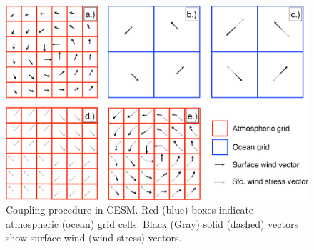 \documentclass[draft,ms]{AGUTeX}
\begin{document}

%
%
%
%
%
%


\newpage

\begin{figure}
\includegraphics[width=0.8\linewidth]{fig_coupling-schematic.pdf}
\caption{Coupling procedure in CESM. Red (blue) boxes indicate atmospheric (ocean) grid cells. Black (Gray) solid (dashed) vectors show surface wind (wind stress) vectors.}
\label{fig:coupling-schematic}
\end{figure}
\end{document}
